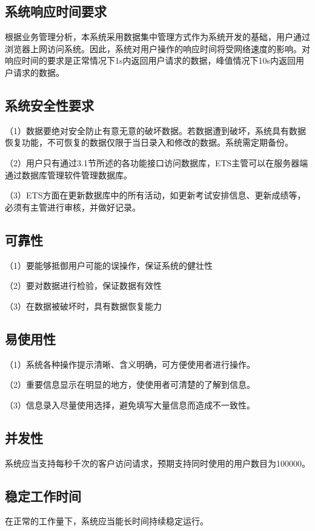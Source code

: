\subsection{系统响应时间要求}
根据业务管理分析，本系统采用数据集中管理方式作为系统开发的基础，用户通过浏览器上网访问系统。因此，系统对用户操作的响应时间将受网络速度的影响。对响应时间的要求是正常情况下1s内返回用户请求的数据，峰值情况下10s内返回用户请求的数据。

\subsection{系统安全性要求}
（1）数据要绝对安全防止有意无意的破坏数据。若数据遭到破坏，系统具有数据恢复功能，不可恢复的数据仅限于当日录入和修改的数据。系统需定期备份。

（2）用户只有通过3.1节所述的各功能接口访问数据库，ETS主管可以在服务器端通过数据库管理软件管理数据库。

（3）ETS方面在更新数据库中的所有活动，如更新考试安排信息、更新成绩等，必须有主管进行审核，并做好记录。

\subsection{可靠性}
（1）要能够抵御用户可能的误操作，保证系统的健壮性

（2）要对数据进行检验，保证数据有效性

（3）在数据被破坏时，具有数据恢复能力

\subsection{易使用性}
（1）系统各种操作提示清晰、含义明确，可方便使用者进行操作。

（2）重要信息显示在明显的地方，使使用者可清楚的了解到信息。

（3）信息录入尽量使用选择，避免填写大量信息而造成不一致性。

\subsection{并发性}
系统应当支持每秒千次的客户访问请求，预期支持同时使用的用户数目为100000。

\subsection{稳定工作时间}
在正常的工作量下，系统应当能长时间持续稳定运行。

